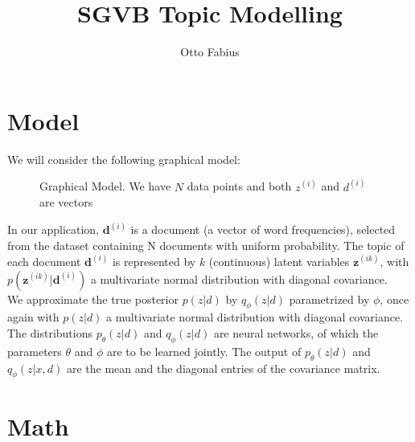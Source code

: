 \documentclass{article}
\author{Otto Fabius}
\title{SGVB Topic Modelling}
\begin{document}
\maketitle

\section{Model}

We will consider the following graphical model:

\begin{figure}[ht]
  \begin{center}
  \end{center}
\caption{Graphical Model. We have $N$ data points and both $z^{(i)}$ and $d^{(i)}$ are vectors}
\label{sgvb}
\end{figure}


In our application, $\mathbf{d}^{(i)}$ is a document (a vector of word frequencies), selected from the dataset containing N documents with uniform probability. The topic of each document $\mathbf{d}^{(i)}$ is represented by $k$ (continuous) latent variables $\mathbf{z}^{(ik)}$, with $p(\mathbf{z}^{(ik)}|\mathbf{d}^{(i)})$ a multivariate normal distribution with diagonal covariance. \\
We approximate the true posterior $p(z|d)$ by $q_\phi(z|d)$ parametrized by $\phi$, once again with $p(z|d)$ a multivariate normal distribution with diagonal covariance. The distributions $p_\theta(z|d)$ and $q_\phi(z|d)$ are neural networks, of which the parameters $\theta$ and $\phi$ are to be learned jointly. The output of $p_\theta(z|d)$ and $q_\phi(z|x,d)$ are the mean and the diagonal entries of the covariance matrix.

\section{Math}
\end{document}
